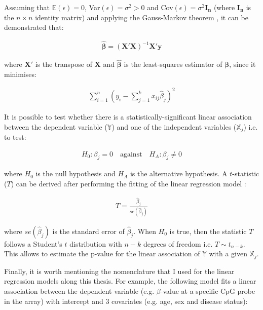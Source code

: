 \bigskip

Assuming that $\mathbb E(\epsilon)=0$, Var$(\epsilon)=\sigma^2 > 0$ and Cov$(\epsilon)= \sigma^2\mathbf{I_n}$ (where $\mathbf{I_n}$ is the $n \times n$ identity matrix) and applying the Gauss-Markov theorem \citep{Eaton2007}, it can be demonstrated that:

\begin{align}
\mathbf{\hat{\beta}} = (\mathbf{X'}\mathbf{X})^{-1}\mathbf{X'}\mathbf{y}
\end{align}

where $\mathbf{X'}$ is the transpose of $\mathbf{X}$ and $\mathbf{\hat{\beta}}$ is the least-squares estimator of $\mathbf{\beta}$, since it minimises:

\begin{align}
\sum_{i=1}^{n} (y_i - \sum_{j=1}^{k} x_{ij}\hat{\beta}_j)^2
\end{align}

It is possible to test whether there is a statistically-significant linear association between the dependent variable ($\mathbb Y$) and one of the independent variables ($\mathbb X_j$) i.e. to test:

\begin{align}
H_0: \beta_j = 0 \quad \text{against} \quad H_A: \beta_j \ne 0
\end{align}
 
where $H_0$ is the null hypothesis and $H_A$ is the alternative hypothesis. A $t$-statistic ($T$) can be derived after performing the fitting of the linear regression model \citep{Sheather2009}:

\begin{align}
T=\frac{\hat{\beta}_j}{se(\hat{\beta}_j)} 
\end{align}

where $se(\hat{\beta}_j)$ is the standard error of $\hat{\beta}_j$. When $H_0$ is true, then the statistic $T$ follows a Student's $t$ distribution with $n-k$ degrees of freedom i.e. $T\sim t_{n-k}$. This allows to estimate the p-value for the linear association of $\mathbb Y$ with a given $\mathbb X_j$.

\bigskip

Finally, it is worth mentioning the nomenclature that I used for the linear regression models along this thesis. For example, the following model fits a linear association between the dependent variable (e.g. $\beta$-value at a specific CpG probe in the array) with intercept and 3 covariates (e.g. age, sex and disease status):

